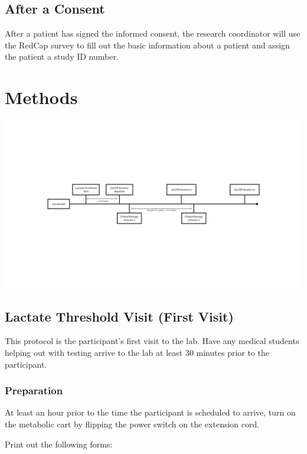 \documentclass[
]{book}
\begin{document}
\hypertarget{after-a-consent}{%
\section{After a Consent}\label{after-a-consent}}

After a patient has signed the informed consent, the research coordinator will use the RedCap survey to fill out the basic information about a patient and assign the patient a study ID number.

\hypertarget{Methods}{%
\chapter{Methods}\label{Methods}}

\includegraphics[width=26.67in]{images/visit_timeline}

\hypertarget{Methods-LT}{%
\section{Lactate Threshold Visit (First Visit)}\label{Methods-LT}}

This protocol is the participant's first visit to the lab. Have any medical students helping out with testing arrive to the lab at least 30 minutes prior to the participant.

\hypertarget{Methods-LT-prep}{%
\subsection{Preparation}\label{Methods-LT-prep}}

At least an hour prior to the time the participant is scheduled to arrive, turn on the metabolic cart by flipping the power switch on the extension cord.

Print out the following forms:
\end{document}
